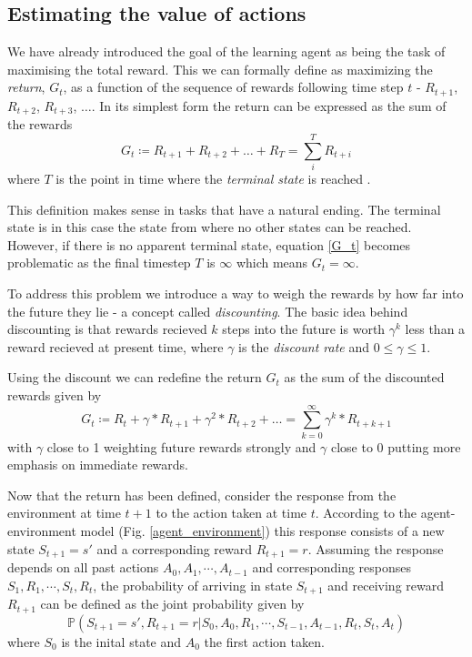 \documentclass[11pt]{article}
\begin{document}
\maketitle

\subsection{Estimating the value of actions}

We have already introduced the goal of the learning agent as being the
task of maximising the total reward.
This we can formally define as maximizing the \textit{return}, $G_t$, as
a function of the sequence of rewards following time step $t$ - $R_{t+1}$,
$R_{t+2}$, $R_{t+3}$, $\hdots$.
In its simplest form the return can be expressed as the sum of the
rewards
\begin{equation}\label{G_t}
    G_t \coloneqq R_{t+1} + R_{t+2} + \hdots + R_{T} = \sum\limits_{i}^T R_{t+i}
\end{equation}
where $T$ is the point in time where the \textit{terminal state} is reached
\cite{RLBook}.

This definition makes sense in tasks that have a natural ending.
The terminal state is in this case the state from where no
other states can be reached.
However, if there is no apparent terminal state, equation \ref{G_t}
becomes problematic as the final timestep $T$ is $\infty$ which means $G_t = \infty$.

To address this problem we introduce a way to weigh the rewards by how far into the
future they lie - a concept called \textit{discounting}.
The basic idea behind discounting is that rewards recieved $k$ steps into the future
is worth $\gamma^k$ less than a reward recieved at present time, where
$\gamma$ is the \textit{discount rate} and $0 \leq \gamma \leq 1$.

Using the discount we can redefine the return $G_t$ as the sum of the discounted
rewards given by
\begin{equation}\label{gammaG_t}
    G_t \coloneqq R_t + \gamma * R_{t+1} + \gamma^2 * R_{t+2} + \hdots 
        = \sum\limits_{k=0}^\infty \gamma^k * R_{t+k+1}
\end{equation}
with $\gamma$ close to 1 weighting future rewards strongly and $\gamma$ close to 0
putting more emphasis on immediate rewards.


Now that the return has been defined, consider the response from the environment at time $t + 1$
to the action taken at time $t$.
According to the agent-environment model (Fig. \ref{agent_environment}) this response consists
of a new state $S_{t+1} = s'$ and a corresponding reward $R_{t+1} = r$.
Assuming the response depends on all past actions $A_{0}, A_{1}, \cdots, A_{t-1}$ and
corresponding responses $S_{1}, R_{1}, \cdots, S_{t}, R_{t}$, the probability
of arriving in state $S_{t+1}$ and receiving reward $R_{t+1}$ can be defined as the
joint probability given by
\begin{equation}
    \mathds{P}(S_{t+1} = s', R_{t+1} = r | S_0, A_0, R_1, \cdots, S_{t-1}, A_{t-1}, R_{t}, S_{t}, A_{t})
\end{equation}
where $S_0$ is the inital state and $A_0$ the first action taken.
\end{document}
